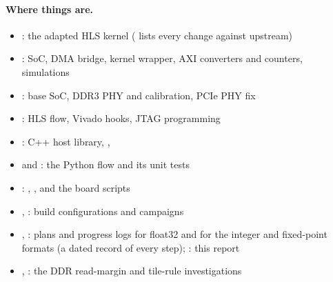 \paragraph{Where things are.}
\begin{itemize}
  \item {}: the adapted HLS kernel ( lists every change against upstream)
  \item {}: SoC, DMA bridge, kernel wrapper, AXI converters and counters, simulations
  \item {}: base SoC, DDR3 PHY and calibration, PCIe PHY fix
  \item {}: HLS flow, Vivado hooks, JTAG programming
  \item {}: C++ host library, , 
  \item {} and : the Python flow and its unit tests
  \item {}: , ,  and the board scripts
  \item {}, : build configurations and campaigns
  \item {}, : plans and progress logs for float32 and for the integer and
        fixed-point formats (a dated record of every step); : this report
  \item {}, : the DDR read-margin and tile-rule investigations
\end{itemize}
